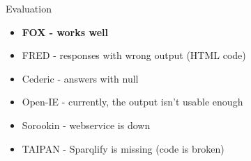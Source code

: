 \begin{frame}{Evaluation}
	\begin{itemize}
		\item \textbf{FOX - works well}
		\item FRED - responses with wrong output (HTML code)
		\item Cederic - answers with null
		\item Open-IE - currently, the output isn't usable enough
		\item Sorookin - webservice is down
		\item TAIPAN - Sparqlify is missing (code is broken)
	\end{itemize}

\end{frame}